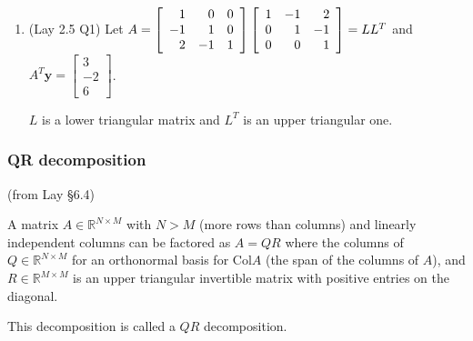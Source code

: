 \documentclass[12pt,letterpaper,noanswers]{exam}
\newcommand{\vc}[1]{\boldsymbol{#1}}
\begin{document}
\begin{enumerate}[resume=classQ]
\item (Lay 2.5 Q1) Let $A = \left[\begin{array}{r r r}
1 & 0 & 0 \\
-1 & 1 & 0 \\
2 & -1 & 1
\end{array}\right]
\left[\begin{array}{r r r}
1 & -1 & 2 \\
0 & 1 & -1 \\
0 & 0 & 1
\end{array}\right] = LL^T$ and $A^T\vc{y} = \left[\begin{array}{r} 3 \\ -2\\ 6\end{array}\right]$. 

$L$ is a lower triangular matrix and $L^T$ is an upper triangular one.  
\end{enumerate}

\subsubsection{QR decomposition}

(from Lay \S 6.4)

A matrix $A\in\mathbb{R}^{N\times M}$ with $N>M$ (more rows than columns) and linearly independent columns can be factored as $A = QR$ where the columns of $Q\in\mathbb{R}^{N\times M}$ for an orthonormal basis for $\text{Col} A$ (the span of the columns of $A$), and $R\in \mathbb{R}^{M\times M}$ is an upper triangular invertible matrix with positive entries on the diagonal.

This decomposition is called a $QR$ decomposition.
\end{document}
